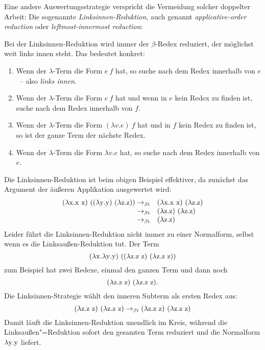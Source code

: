 Eine andere Auswertungsstrategie verspricht die Vermeidung
solcher doppelter Arbeit:  Die sogenannte \textit{Linksinnen-Reduktion},
auch genannt \emph{applicative-order reduction} oder
\emph{leftmost-innermost reduction}:
%
\begin{definition}
  Bei der Linksinnen-Reduktion wird immer der $\beta$-Redex reduziert,
  der möglichst weit links innen steht.  Das bedeutet konkret:
  \begin{enumerate}
  \item Wenn der $\lambda$-Term die Form $e~f$ hat, so suche nach dem Redex innerhalb
    von $e$~-- also \emph{links innen}.
  \item Wenn der $\lambda$-Term die Form $e~f$ hat und wenn in $e$ kein Redex zu finden
    ist, suche nach dem Redex innerhalb von $f$.
  \item Wenn der $\lambda$-Term die Form $(\lambda v.e)~f$ hat und in
    $f$ kein Redex zu finden ist, so
    ist der ganze Term der nächste Redex.
  \item Wenn der $\lambda$-Term die Form $\lambda v.e$ hat, so suche
    nach dem Redex innerhalb von $e$.
  \end{enumerate}
\end{definition}
%
Die Linksinnen-Reduktion ist beim obigen Beispiel effektiver, da
zunächst das Argument der äußeren Applikation ausgewertet wird:
%
\begin{displaymath}
  \begin{array}{rl}
  (\lambda \mathrm x.\mathrm x~\mathrm x)~((\lambda \mathrm y.\mathrm y)~(\lambda \mathrm z.\mathrm z))
  \rightarrow_{\beta i} & 
  (\lambda \mathrm x.\mathrm x~\mathrm x)~(\lambda \mathrm z.\mathrm z)
  \\
  \rightarrow_{\beta i} & 
  (\lambda \mathrm z.\mathrm z)~(\lambda \mathrm z.\mathrm z)
  \\
  \rightarrow_{\beta i} & 
  (\lambda \mathrm z.\mathrm z)
\end{array}
\end{displaymath}
%
Leider führt die Linksinnen-Reduktion nicht immer zu einer Normalform,
selbst wenn es die Linksaußen-Reduktion tut.  Der Term
\[ (\lambda \mathrm x.\lambda \mathrm y.\mathrm y)~((\lambda \mathrm z.\mathrm z~\mathrm z)~(\lambda \mathrm z.\mathrm z~\mathrm z)) \]
zum Beispiel hat zwei Redexe, einmal den ganzen Term und dann noch
\[(\lambda \mathrm z.\mathrm z~\mathrm z)~(\lambda \mathrm z.\mathrm z~\mathrm z).\]  Die Linksinnen-Strategie wählt
den inneren Subterm als ersten Redex aus:
%
\begin{displaymath}
  (\lambda \mathrm z.\mathrm z~\mathrm z)~(\lambda \mathrm z.\mathrm z~\mathrm z)
\rightarrow_{\beta i}
  (\lambda \mathrm z.\mathrm z~\mathrm z)~(\lambda \mathrm z.\mathrm z~\mathrm z)
\end{displaymath}
%
Damit läuft die Linksinnen-Reduktion unendlich im Kreis, während
die Linksaußen"=Reduktion sofort den gesamten Term reduziert und die
Normalform $\lambda \mathrm y.\mathrm y$ liefert.


